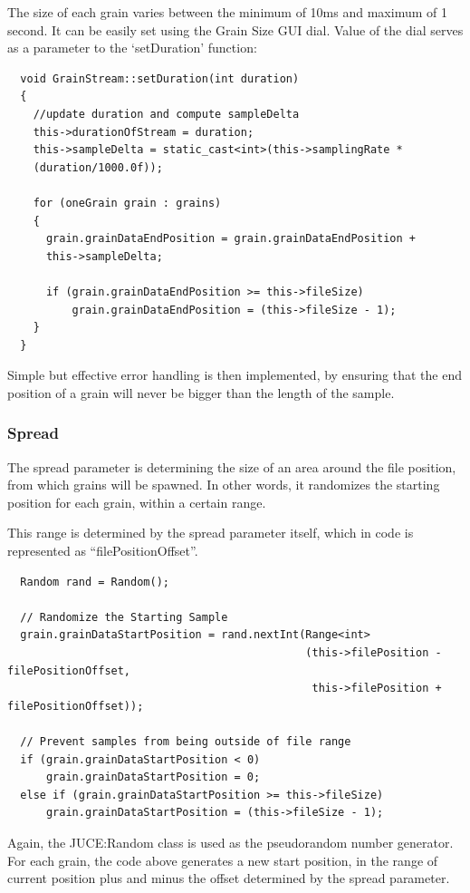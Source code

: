 The size of each grain varies between the minimum of 10ms and maximum
of 1 second. It can be easily set using the Grain Size GUI dial. Value
of the dial serves as a parameter to the `setDuration' function:
\begin{lstlisting}
  void GrainStream::setDuration(int duration)
  {
    //update duration and compute sampleDelta
    this->durationOfStream = duration;
    this->sampleDelta = static_cast<int>(this->samplingRate *
    (duration/1000.0f));

    for (oneGrain grain : grains)
    {
      grain.grainDataEndPosition = grain.grainDataEndPosition +
      this->sampleDelta;

      if (grain.grainDataEndPosition >= this->fileSize)
          grain.grainDataEndPosition = (this->fileSize - 1);
    }
  }
\end{lstlisting}

Simple but effective error handling is then implemented, by ensuring
that the end position of a grain will never be bigger than the length
of the sample.

\subsubsection{Spread}

The spread parameter is determining the size of an area around the
file position, from which grains will be spawned. In other words, it
randomizes the starting position for each grain, within a certain
range. 

This range is determined by the spread parameter itself, which in code
is represented as ``filePositionOffset''. 
\begin{lstlisting}
  Random rand = Random();

  // Randomize the Starting Sample
  grain.grainDataStartPosition = rand.nextInt(Range<int>
                                              (this->filePosition - filePositionOffset,
                                               this->filePosition + filePositionOffset));

  // Prevent samples from being outside of file range 
  if (grain.grainDataStartPosition < 0)
      grain.grainDataStartPosition = 0;
  else if (grain.grainDataStartPosition >= this->fileSize)
      grain.grainDataStartPosition = (this->fileSize - 1);
\end{lstlisting}

Again, the JUCE:Random class is used as the pseudorandom number
generator. For each grain, the code above generates a new start
position, in the range of current position plus and minus the offset
determined by the spread parameter.

